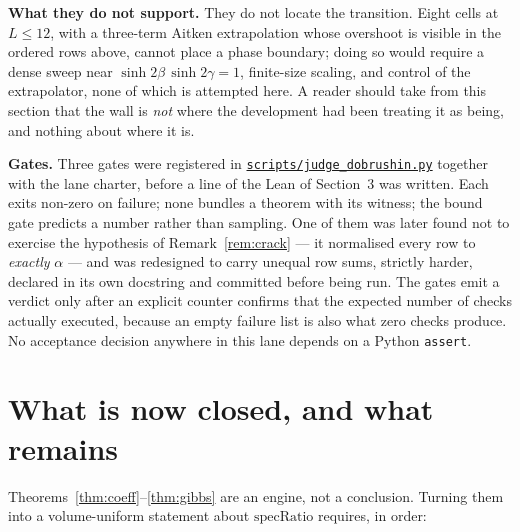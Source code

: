 \documentclass[11pt]{article}
\theoremstyle{definition}
\newcommand{\anchor}{c7b870b05bd6d1bec270d499e1358a64070ce0e1}
\newcommand{\repofile}[2]{%
  \href{https://github.com/lluiseriksson/THE-ERIKSSON-PROGRAMME/blob/\anchor/#1}{\nolinkurl{#2}}}
\newcommand{\specRatio}{\mathrm{specRatio}}
\begin{document}
\textbf{What they do not support.}  They do not locate the transition.  Eight
cells at $L\le12$, with a three-term Aitken extrapolation whose overshoot is
visible in the ordered rows above, cannot place a phase boundary; doing so would
require a dense sweep near $\sinh2\beta\,\sinh2\gamma=1$, finite-size scaling,
and control of the extrapolator, none of which is attempted here.  A reader
should take from this section that the wall is \emph{not} where the development
had been treating it as being, and nothing about where it is.

\textbf{Gates.}  Three gates were registered in
\repofile{scripts/judge\_dobrushin.py}{scripts/judge\_dobrushin.py} together with
the lane charter, before a line of the Lean of Section~3 was written.  Each exits
non-zero on failure; none bundles a theorem with its witness; the bound gate
predicts a number rather than sampling.  One of them was later found not to
exercise the hypothesis of Remark~\ref{rem:crack} --- it normalised every row to
\emph{exactly} $\alpha$ --- and was redesigned to carry unequal row sums,
strictly harder, declared in its own docstring and committed before being run.
The gates emit a verdict only after an explicit counter confirms that the
expected number of checks actually executed, because an empty failure list is
also what zero checks produce.  No acceptance decision anywhere in this lane
depends on a Python \texttt{assert}.

\section{What is now closed, and what remains}
\label{sec:frontier}

Theorems~\ref{thm:coeff}--\ref{thm:gibbs} are an engine, not a conclusion.
Turning them into a volume-uniform statement about $\specRatio$ requires, in
order:
\end{document}
